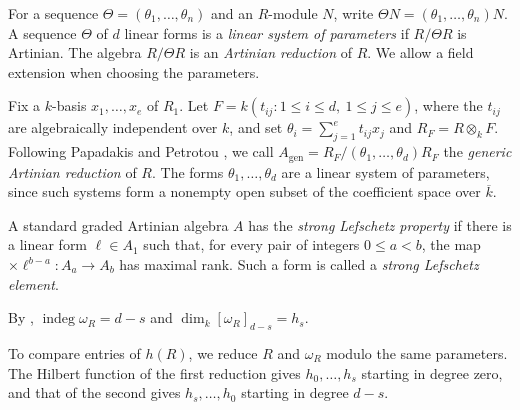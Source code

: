 \documentclass[a4paper,11pt]{amsart}
\DeclareMathOperator{\indeg}{indeg}
\newcommand{\kk}{k}
\theoremstyle{definition}
\begin{document}
For a sequence $\Theta=(\theta_1,\ldots,\theta_n)$ and an $R$-module $N$, write $\Theta N=(\theta_1,\ldots,\theta_n)N$. A sequence $\Theta$ of $d$ linear forms is a \emph{linear system of parameters} if $R/\Theta R$ is Artinian. The algebra $R/\Theta R$ is an \emph{Artinian reduction} of $R$. We allow a field extension when choosing the parameters.

Fix a $\kk$-basis $x_1,\ldots,x_e$ of $R_1$. Let $F=\kk(t_{ij}:1\le i\le d,\ 1\le j\le e)$, where the $t_{ij}$ are algebraically independent over $\kk$, and set $\theta_i=\sum_{j=1}^e t_{ij}x_j$ and $R_F=R\otimes_{\kk}F$. Following Papadakis and Petrotou \cite[Definition~2.2]{PP20}, we call $A_{\mathrm{gen}}=R_F/(\theta_1,\ldots,\theta_d)R_F$ the \emph{generic Artinian reduction} of $R$. The forms $\theta_1,\ldots,\theta_d$ are a linear system of parameters, since such systems form a nonempty open subset of the coefficient space over $\overline{\kk}$.

A standard graded Artinian algebra $A$ has the \emph{strong Lefschetz property} if there is a linear form $\ell\in A_1$ such that, for every pair of integers $0\le a<b$, the map $\times\ell^{b-a}\colon A_a\to A_b$ has maximal rank. Such a form is called a \emph{strong Lefschetz element}.

By \cite[Corollary~4.4.6~(a)]{BH98}, $\indeg\omega_R=d-s$ and $\dim_{\kk}[\omega_R]_{d-s}=h_s$.

To compare entries of $h(R)$, we reduce $R$ and $\omega_R$ modulo the same parameters. The Hilbert function of the first reduction gives $h_0,\ldots,h_s$ starting in degree zero, and that of the second gives $h_s,\ldots,h_0$ starting in degree $d-s$.
\end{document}
